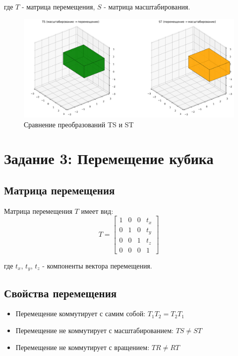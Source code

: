 где $T$ - матрица перемещения, $S$ - матрица масштабирования.

\begin{figure}[h]
\centering
\includegraphics[width=\textwidth]{images/task2/TS_vs_ST_comparison.png}
\caption{Сравнение преобразований TS и ST}
\label{fig:TS_vs_ST_comparison}
\end{figure}

\section*{Задание 3: Перемещение кубика}

\subsection*{Матрица перемещения}

Матрица перемещения $T$ имеет вид:
\begin{equation}
T = \begin{bmatrix}
1 & 0 & 0 & t_x \\
0 & 1 & 0 & t_y \\
0 & 0 & 1 & t_z \\
0 & 0 & 0 & 1
\end{bmatrix}
\end{equation}

где $t_x$, $t_y$, $t_z$ - компоненты вектора перемещения.

\subsection*{Свойства перемещения}

\begin{itemize}
\item Перемещение коммутирует с самим собой: $T_1 T_2 = T_2 T_1$
\item Перемещение не коммутирует с масштабированием: $TS \neq ST$
\item Перемещение не коммутирует с вращением: $TR \neq RT$
\end{itemize}

